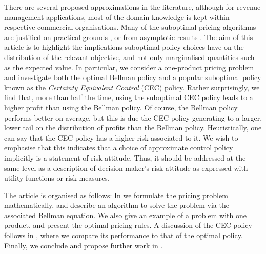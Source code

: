 \documentclass[main.tex]{subfiles}
\begin{document}
There are several proposed approximations in the
literature, although for revenue management applications, most of the domain knowledge is kept within
respective commercial organisations.
Many of the suboptimal pricing algorithms are justified on practical grounds
\cite{aviv2012dynamic}, or
from asymptotic results \cite{gallego1994optimal}.
The aim of this article is to highlight the implications suboptimal policy
choices have on the distribution of the relevant objective, and not
only marginalised quantities such as the expected value.
In particular, we consider a one-product pricing problem and
investigate both the optimal Bellman policy and a popular suboptimal
policy known as the \emph{Certainty Equivalent Control} (CEC)
policy.
Rather surprisingly, we find that, more than half the
time, using the suboptimal CEC policy
leads to a higher profit than using the Bellman policy. Of course, the
Bellman policy performs better on average, but
this is due the CEC policy generating to a larger, lower tail on the
distribution of profits than the Bellman policy.
Heuristically, one can say that the CEC policy has a higher risk
associated to it. We wish to emphasise that this indicates that a
choice of approximate control policy implicitly is a statement of
risk attitude. Thus, it should be addressed at the same level as a
description of decision-maker's risk attitude as expressed with
utility functions or risk measures.


The article is organised as follows:
In  we formulate the
pricing problem mathematically, and describe an algorithm to solve the
problem via the associated Bellman equation. We also give an example
of a problem with one product, and present the optimal pricing rules.
A discussion of the CEC policy follows in
, where we compare its
performance to that of
the optimal policy.
Finally, we conclude and propose further work in .

\biblio
\end{document}
